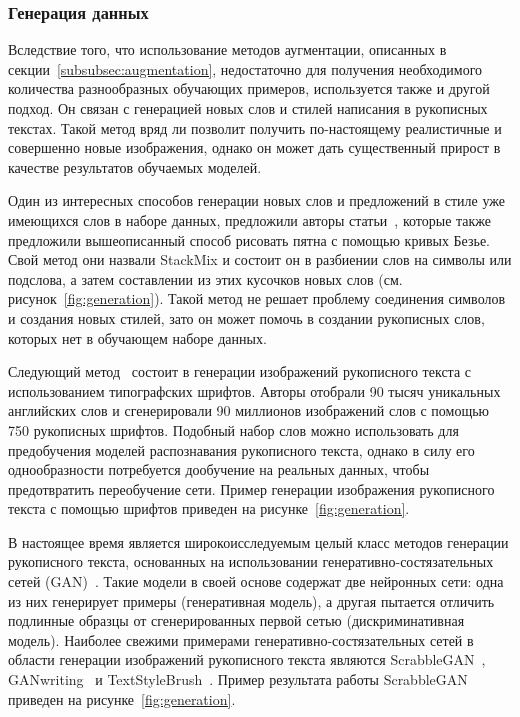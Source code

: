 \subsubsection{Генерация данных}
\label{subsubsec:generation}

Вследствие того, что использование методов аугментации, описанных в секции~\ref{subsubsec:augmentation}, недостаточно для
получения необходимого количества разнообразных обучающих примеров, используется также и другой подход.
Он связан с генерацией новых слов и стилей написания в рукописных текстах.
Такой метод вряд ли позволит получить по-настоящему реалистичные и совершенно новые изображения, однако он может дать
существенный прирост в качестве результатов обучаемых моделей.

Один из интересных способов генерации новых слов и предложений в стиле уже имеющихся слов в наборе данных,
предложили авторы статьи~\cite{shonenkov2021stackmix}, которые также предложили вышеописанный способ рисовать пятна с помощью кривых Безье.
Свой метод они назвали StackMix и состоит он в разбиении слов на символы или подслова, а затем составлении из этих кусочков новых слов (см. рисунок~\ref{fig:generation}).
Такой метод не решает проблему соединения символов и создания новых стилей, зато он может помочь в создании рукописных слов,
которых нет в обучающем наборе данных.

Следующий метод~\cite{krishnan2016generating} состоит в генерации изображений рукописного текста с использованием типографских шрифтов.
Авторы отобрали 90 тысяч уникальных английских слов и сгенерировали 90 миллионов изображений слов с помощью 750 рукописных шрифтов.
Подобный набор слов можно использовать для предобучения моделей распознавания рукописного текста,
однако в силу его однообразности потребуется дообучение на реальных данных, чтобы предотвратить переобучение сети.
Пример генерации изображения рукописного текста с помощью шрифтов приведен на рисунке~\ref{fig:generation}.

В настоящее время является широкоисследуемым целый класс методов генерации рукописного текста,
основанных на использовании генеративно-состязательных сетей (GAN)~\cite{goodfellow2020generative}.
Такие модели в своей основе содержат две нейронных сети: одна из них генерирует примеры (генеративная модель),
а другая пытается отличить подлинные образцы от сгенерированных первой сетью (дискриминативная модель).
Наиболее свежими примерами генеративно-состязательных сетей в области генерации изображений рукописного текста являются
ScrabbleGAN~\cite{fogel2020scrabblegan}, GANwriting~\cite{kang2020ganwriting} и TextStyleBrush~\cite{krishnan2023textstylebrush}.
Пример результата работы ScrabbleGAN приведен на рисунке~\ref{fig:generation}.

